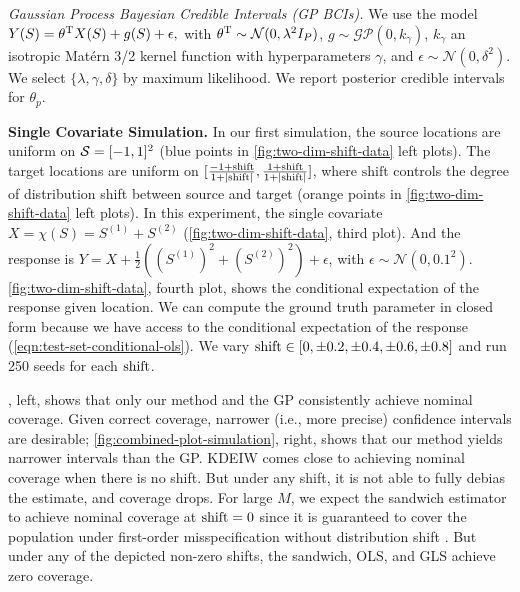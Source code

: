 \emph{Gaussian Process Bayesian Credible Intervals (GP BCIs).} We use the model
$
    Y(S) = \theta^{\mathrm{T}} X(S) + g(S) + \epsilon, 
$
with $\theta^{\mathrm{T}} \sim \mathcal{N}(0, \lambda^2 I_P)$, $g \sim \mathcal{GP}(0, k_{\gamma})$, $k_{\gamma}$ an isotropic Mat\'ern 3/2 kernel function with hyperparameters $\gamma$, and $\epsilon \sim \mathcal{N}(0, \delta^2)$. We select $\{\lambda,\gamma, \delta\}$ by maximum likelihood. We report posterior credible intervals for $\theta_p$.

\textbf{Single Covariate Simulation.} In our first simulation, the source locations are uniform on $\mathcal{S} = [-1,1]^2$ (blue points in \cref{fig:two-dim-shift-data} left plots). The target locations are uniform on $[\frac{-1 + \mathrm{shift}}{1+|\mathrm{shift}|}, \frac{1 + \mathrm{shift}}{1+|\mathrm{shift}|}]$, where $\mathrm{shift}$ controls the degree of distribution shift between source and target (orange points in \cref{fig:two-dim-shift-data} left plots). In this experiment, the single covariate $X=\chi(S) = S^{(1)} + S^{(2)}$ (\cref{fig:two-dim-shift-data}, third plot). And the response is $Y = X + \frac{1}{2}((S^{(1)})^2 + (S^{(2)})^2) + \epsilon$, with $\epsilon \sim \mathcal{N}(0,0.1^2)$. \cref{fig:two-dim-shift-data}, fourth plot, shows the conditional expectation of the response given location. We can compute the ground truth parameter in closed form because we have access to the conditional expectation of the response (\cref{eqn:test-set-conditional-ols}). We vary $\mathrm{shift} \in [0, \pm0.2,\pm0.4, \pm0.6, \pm0.8]$ and run 250 seeds for each $\mathrm{shift}$.

, left, shows that only our method and the GP consistently achieve nominal coverage. Given correct coverage, narrower (i.e., more precise) confidence intervals are desirable; \cref{fig:combined-plot-simulation}, right, shows that our method yields narrower intervals than the GP. KDEIW comes close to achieving nominal coverage when there is no shift. But under any shift, it is not able to fully debias the estimate, and coverage drops. For large $M$, we expect the sandwich estimator to achieve nominal coverage at $\mathrm{shift}=0$ since it is guaranteed to cover the population under first-order misspecification without distribution shift \citep{huber_behavior_1967,white_1980_usingleastsquares}. But under any of the depicted non-zero shifts, the sandwich, OLS, and GLS achieve zero coverage.

